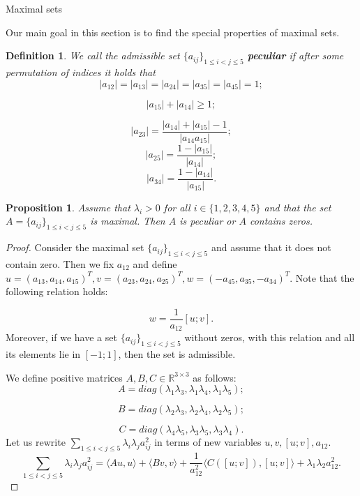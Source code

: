 \documentclass[12pt]{article}
\newtheorem{proposition}{Proposition}[section]
\newtheorem{definition}{Definition}[section]
\begin{document}
\begin{section}{Maximal sets}
\label{s6}

    Our main goal in this section is to find the special properties of maximal sets.
    
    \begin{definition}
    \label{def-bad}
        We call the admissible set $\{a_{ij}\}_{1\leq i<j\leq 5}$  \textbf{ peculiar} if after some permutation of indices it holds that 
        $$
            |a_{12}|=|a_{13}|=|a_{24}|=|a_{35}|=|a_{45}|=1;
        $$ 
        
        $$
            |a_{15}| + |a_{14}|\geq 1;
        $$ 
        
        $$
            |a_{23}| = \frac{|a_{14}| + |a_{15}| - 1}{|a_{14}a_{15}|};
        $$
        $$
            |a_{25}| = \frac{1-|a_{15}|}{|a_{14}|};
        $$
        $$
            |a_{34}| = \frac{1-|a_{14}|}{|a_{15}|}.
        $$
    \end{definition}
    
    \begin{proposition}
        \label{max-form}
        Assume that $\lambda_{i}> 0$ for all $i\in\{1,2,3,4,5\}$ and that the set $A=\{a_{ij}\}_{1\leq i<j\leq 5}$ is maximal. Then $A$ is  peculiar or $A$ contains zeros. 
    \end{proposition}
    
    \begin{proof}
        Consider the maximal set $\{a_{ij}\}_{1\leq i < j\leq 5}$ and assume that it does not contain zero. Then we fix $a_{12}$ and define $u=(a_{13}, a_{14}, a_{15})^{T}, v=(a_{23},a_{24},a_{25})^{T}, w = (-a_{45},a_{35},-a_{34})^{T}$. Note that the following relation holds:
    
        $$
            w = \frac{1}{a_{12}}[u; v].
        $$
        Moreover, if we have a set $\{a_{ij}\}_{1\leq i < j\leq 5}$ without zeros, with this relation and all its elements lie in $[-1;1]$, then the set is admissible. 
    
         We define positive matriсes $A,B,C \in \mathbb{R}^{3\times 3}$ as follows:  
        $$
            A = diag(\lambda_{1}\lambda_{3}, \lambda_{1}\lambda_{4},\lambda_{1}\lambda_{5});
        $$ 
        
        $$
            B = diag(\lambda_{2}\lambda_{3}, \lambda_{2}\lambda_{4},\lambda_{2}\lambda_{5});
        $$
        
        $$ 
            C = diag(\lambda_{4}\lambda_{5}, \lambda_{3}\lambda_{5},\lambda_{3}\lambda_{4}).
        $$ 
        Let us rewrite $\sum_{1\leq i < j\leq 5}\lambda_{i}\lambda_{j} a_{ij}^{2}$ in terms of new variables $u,v,[u;v], a_{12}$.
        $$
            \sum_{1\leq i < j\leq 5}\lambda_{i}\lambda_{j} a_{ij}^{2} = \langle Au, u\rangle + \langle Bv, v\rangle + \frac{1}{a_{12}^2}\langle C ([u;v]), [u;v]\rangle + \lambda_{1}\lambda_{2}a_{12}^2.
        $$
    

\end{proof}
\end{section}
\end{document}

